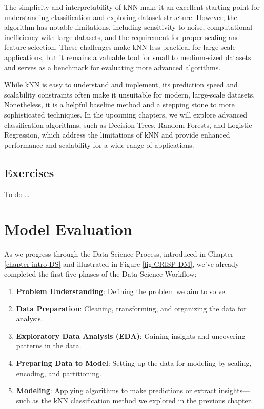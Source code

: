 \documentclass[
]{book}
\providecommand{\tightlist}{%
  \setlength{\itemsep}{0pt}\setlength{\parskip}{0pt}}
\theoremstyle{definition}
\theoremstyle{definition}
\theoremstyle{definition}
\theoremstyle{definition}
\theoremstyle{remark}
\begin{document}
The simplicity and interpretability of kNN make it an excellent starting point for understanding classification and exploring dataset structure. However, the algorithm has notable limitations, including sensitivity to noise, computational inefficiency with large datasets, and the requirement for proper scaling and feature selection. These challenges make kNN less practical for large-scale applications, but it remains a valuable tool for small to medium-sized datasets and serves as a benchmark for evaluating more advanced algorithms.

While kNN is easy to understand and implement, its prediction speed and scalability constraints often make it unsuitable for modern, large-scale datasets. Nonetheless, it is a helpful baseline method and a stepping stone to more sophisticated techniques. In the upcoming chapters, we will explore advanced classification algorithms, such as Decision Trees, Random Forests, and Logistic Regression, which address the limitations of kNN and provide enhanced performance and scalability for a wide range of applications.

\section{Exercises}\label{exercises-3}

To do \ldots{}

\chapter{Model Evaluation}\label{chapter-evaluation}

As we progress through the Data Science Process, introduced in Chapter \ref{chapter-intro-DS} and illustrated in Figure \ref{fig:CRISP-DM}, we've already completed the first five phases of the Data Science Workflow:

\begin{enumerate}
\def\labelenumi{\arabic{enumi}.}
\tightlist
\item
  \textbf{Problem Understanding}: Defining the problem we aim to solve.\\
\item
  \textbf{Data Preparation}: Cleaning, transforming, and organizing the data for analysis.\\
\item
  \textbf{Exploratory Data Analysis (EDA)}: Gaining insights and uncovering patterns in the data.\\
\item
  \textbf{Preparing Data to Model}: Setting up the data for modeling by scaling, encoding, and partitioning.\\
\item
  \textbf{Modeling}: Applying algorithms to make predictions or extract insights---such as the kNN classification method we explored in the previous chapter.
\end{enumerate}
\end{document}
